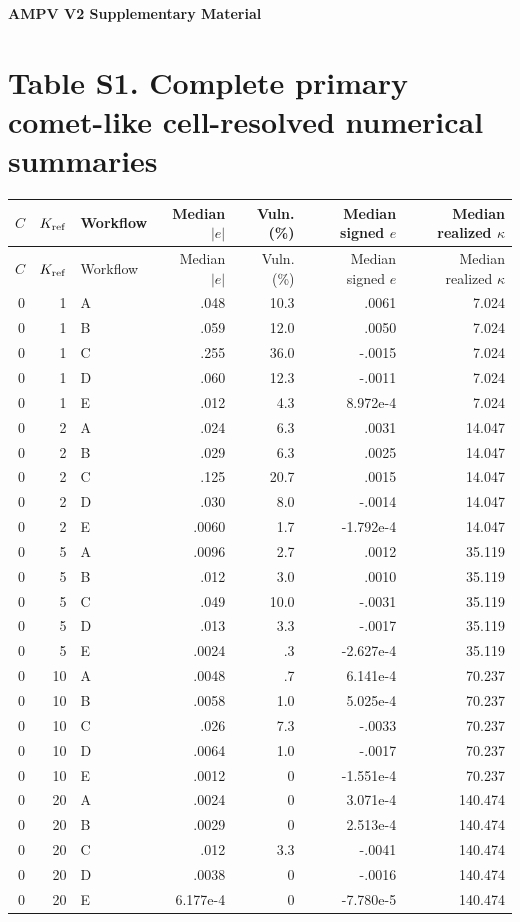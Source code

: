 \documentclass[9pt]{article}
\begin{document}
\begin{center}{\Large\bfseries AMPV V2 Supplementary Material}\end{center}
\section*{Table S1. Complete primary comet-like cell-resolved numerical summaries}
\scriptsize\begin{longtable}{rrlrrrr}\toprule $C$&$K_{\rm ref}$&Workflow&Median $|e|$&Vuln. (\%)&Median signed $e$&Median realized $\kappa$\\\midrule\endfirsthead
\toprule $C$&$K_{\rm ref}$&Workflow&Median $|e|$&Vuln. (\%)&Median signed $e$&Median realized $\kappa$\\\midrule\endhead
0&1&A&.048&10.3&.0061&7.024\\
0&1&B&.059&12.0&.0050&7.024\\
0&1&C&.255&36.0&-.0015&7.024\\
0&1&D&.060&12.3&-.0011&7.024\\
0&1&E&.012&4.3&8.972e-4&7.024\\
0&2&A&.024&6.3&.0031&14.047\\
0&2&B&.029&6.3&.0025&14.047\\
0&2&C&.125&20.7&.0015&14.047\\
0&2&D&.030&8.0&-.0014&14.047\\
0&2&E&.0060&1.7&-1.792e-4&14.047\\
0&5&A&.0096&2.7&.0012&35.119\\
0&5&B&.012&3.0&.0010&35.119\\
0&5&C&.049&10.0&-.0031&35.119\\
0&5&D&.013&3.3&-.0017&35.119\\
0&5&E&.0024&.3&-2.627e-4&35.119\\
0&10&A&.0048&.7&6.141e-4&70.237\\
0&10&B&.0058&1.0&5.025e-4&70.237\\
0&10&C&.026&7.3&-.0033&70.237\\
0&10&D&.0064&1.0&-.0017&70.237\\
0&10&E&.0012&0&-1.551e-4&70.237\\
0&20&A&.0024&0&3.071e-4&140.474\\
0&20&B&.0029&0&2.513e-4&140.474\\
0&20&C&.012&3.3&-.0041&140.474\\
0&20&D&.0038&0&-.0016&140.474\\
0&20&E&6.177e-4&0&-7.780e-5&140.474\\

\end{longtable}
\end{document}
